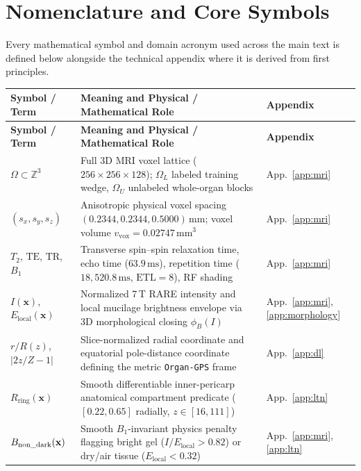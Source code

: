 \documentclass[10pt,a4paper]{article}
\renewcommand{\_}{\origunderscore\allowbreak}
\begin{document}
\clearpage
\section*{Nomenclature and Core Symbols}

Every mathematical symbol and domain acronym used across the main text is defined below alongside the technical appendix where it is derived from first principles.

{\footnotesize
\renewcommand{\arraystretch}{1.24}
\begin{xltabular}{\textwidth}{L{2.7cm} Y L{2.2cm}}
\toprule
{}\textbf{Symbol / Term} & \textbf{Meaning and Physical / Mathematical Role} & \textbf{Appendix} \\
\midrule
\endfirsthead
\toprule
{}\textbf{Symbol / Term} & \textbf{Meaning and Physical / Mathematical Role} & \textbf{Appendix} \\
\midrule
\endhead
\bottomrule
\endfoot
$\Omega \subset \mathbb{Z}^3$ & Full 3D MRI voxel lattice ($256 \times 256 \times 128$); $\Omega_L$ labeled training wedge, $\Omega_U$ unlabeled whole-organ blocks & App.~\ref{app:mri} \\
$(s_x, s_y, s_z)$ & Anisotropic physical voxel spacing $(0.2344, 0.2344, 0.5000)\,\text{mm}$; voxel volume $v_{\text{vox}} = 0.02747\,\text{mm}^3$ & App.~\ref{app:mri} \\
$T_2$, $\text{TE}$, $\text{TR}$, $B_1$ & Transverse spin--spin relaxation time, echo time ($63.9\,\text{ms}$), repetition time ($18{,}520.8\,\text{ms}$, $\text{ETL}=8$), RF shading & App.~\ref{app:mri} \\
$I(\mathbf{x})$, $E_{\text{local}}(\mathbf{x})$ & Normalized 7\,T RARE intensity and local mucilage brightness envelope via 3D morphological closing $\phi_B(I)$ & App.~\ref{app:mri}, \ref{app:morphology} \\
$r/R(z)$, $|2z/Z-1|$ & Slice-normalized radial coordinate and equatorial pole-distance coordinate defining the metric \texttt{Organ-GPS} frame & App.~\ref{app:dl} \\
$R_{\text{ring}}(\mathbf{x})$ & Smooth differentiable inner-pericarp anatomical compartment predicate ($[0.22, 0.65]$ radially, $z \in [16, 111]$) & App.~\ref{app:ltn} \\
$B_{\text{non\_dark}}(\mathbf{x})$ & Smooth $B_1$-invariant physics penalty flagging bright gel ($I/E_{\text{local}} > 0.82$) or dry/air tissue ($E_{\text{local}} < 0.32$) & App.~\ref{app:mri}, \ref{app:ltn} \\

\end{xltabular}}
\end{document}
